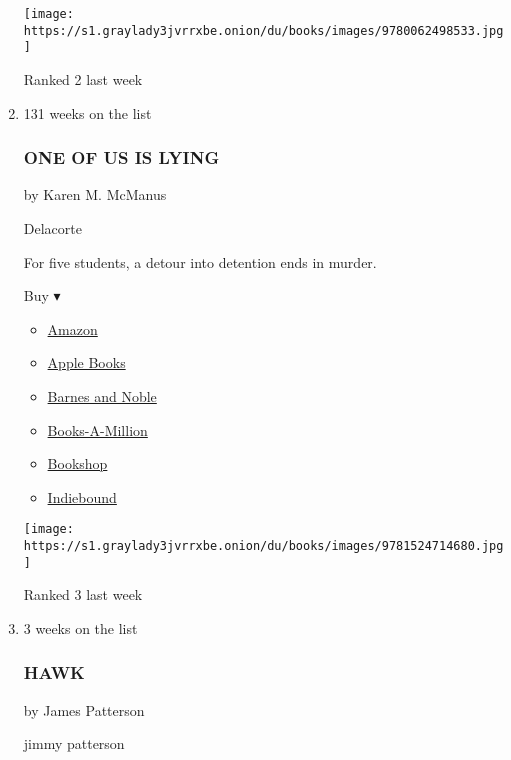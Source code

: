 \begin{enumerate}
  \texttt{[image: https://s1.graylady3jvrrxbe.onion/du/books/images/9780062498533.jpg]}

  Ranked 2 last week
\item
  131 weeks on the list

  \hypertarget{one-of-us-is-lying}{%
  \subsubsection{ONE OF US IS LYING}\label{one-of-us-is-lying}}

  by Karen M. McManus

  Delacorte

  For five students, a detour into detention ends in murder.

  Buy ▾

  \begin{itemize}
  \tightlist
  \item
    \href{https://www.amazon.com/One-Us-Lying-Karen-McManus/dp/1524714682?tag=NYTBS-20}{Amazon}
  \item
    \href{https://du-gae-books-dot-nyt-du-prd.appspot.com/buy?title=ONE+OF+US+IS+LYING\&author=Karen+M+McManus}{Apple
    Books}
  \item
    \href{https://www.anrdoezrs.net/click-7990613-11819508?url=https\%3A\%2F\%2Fwww.barnesandnoble.com\%2Fw\%2F\%3Fean\%3D9781524714680}{Barnes
    and Noble}
  \item
    \href{https://www.anrdoezrs.net/click-7990613-35140?url=https\%3A\%2F\%2Fwww.booksamillion.com\%2Fp\%2FONE\%2BOF\%2BUS\%2BIS\%2BLYING\%2FKaren\%2BM\%2BMcManus\%2F9781524714680}{Books-A-Million}
  \item
    \href{https://bookshop.org/a/3546/9781524714680}{Bookshop}
  \item
    \href{https://www.indiebound.org/book/9781524714680?aff=NYT}{Indiebound}
  \end{itemize}

  \texttt{[image: https://s1.graylady3jvrrxbe.onion/du/books/images/9781524714680.jpg]}

  Ranked 3 last week
\item
  3 weeks on the list

  \hypertarget{hawk}{%
  \subsubsection{HAWK}\label{hawk}}

  by James Patterson

  jimmy patterson


\end{enumerate}

